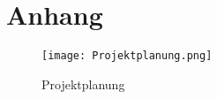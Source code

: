 \section{Anhang}

\begin{figure}[h!] 
\centering
\texttt{[image: Projektplanung.png]}%
\caption{Projektplanung}%
\label{fig::Projektplanung_1}%
\end{figure}
